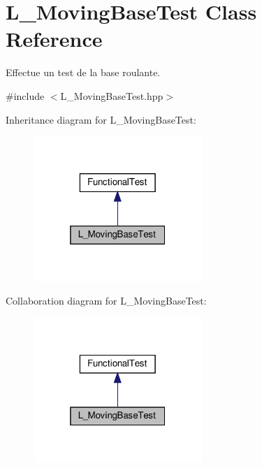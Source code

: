 \hypertarget{classL__MovingBaseTest}{}\section{L\+\_\+\+Moving\+Base\+Test Class Reference}
\label{classL__MovingBaseTest}


Effectue un test de la base roulante.  




{\ttfamily \#include $<$L\+\_\+\+Moving\+Base\+Test.\+hpp$>$}



Inheritance diagram for L\+\_\+\+Moving\+Base\+Test\+:
\nopagebreak
\begin{figure}[H]
\begin{center}
\leavevmode
\includegraphics[width=181pt]{classL__MovingBaseTest__inherit__graph}
\end{center}
\end{figure}


Collaboration diagram for L\+\_\+\+Moving\+Base\+Test\+:
\nopagebreak
\begin{figure}[H]
\begin{center}
\leavevmode
\includegraphics[width=181pt]{classL__MovingBaseTest__coll__graph}
\end{center}
\end{figure}
